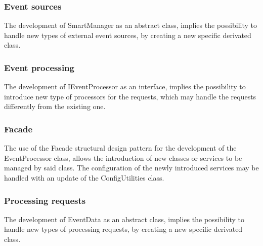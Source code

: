 	\subsubsection{Event sources}
	The development of SmartManager as an abstract class, implies the possibility to handle new types of external event sources, by creating a new specific derivated class.
	\subsubsection{Event processing}
	The development of IEventProcessor as an interface, implies the possibility to introduce new type of processors for the requests, which may handle the requests differently from the existing one.
	\subsubsection{Facade}
	The use of the Facade structural design pattern for the development of the EventProcessor class, allows the introduction of new classes or services to be managed by said class. The configuration of the newly introduced services may be handled with an update of the ConfigUtilities class.
	\subsubsection{Processing requests}
	The development of EventData as an abstract class, implies the possibility to handle new types of processing requests, by creating a new specific derivated class.